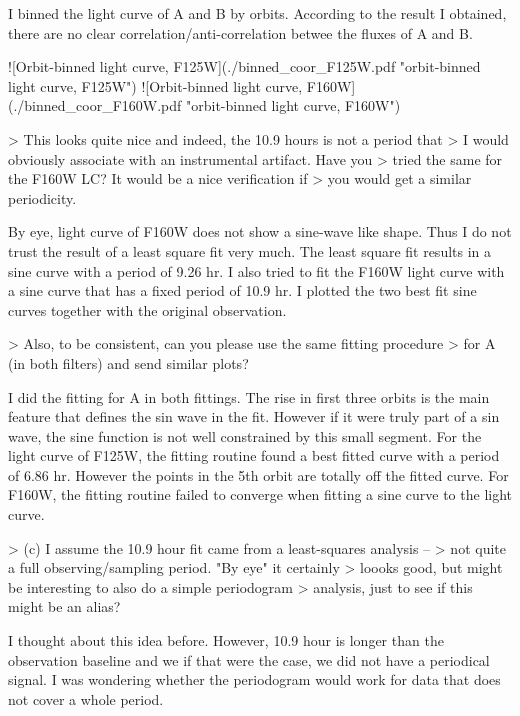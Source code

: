 \documentclass[paper=letter, fontsize=11pt]{scrartcl} %
\numberwithin{equation}{section} %
\numberwithin{figure}{section} %
\numberwithin{table}{section} %
\begin{document}
I binned the light curve of A and B by orbits. According to the result
I obtained, there are no clear correlation/anti-correlation betwee the
fluxes of A and B.

![Orbit-binned light curve, F125W](./binned_coor_F125W.pdf
"orbit-binned light curve, F125W")
![Orbit-binned light curve, F160W](./binned_coor_F160W.pdf
 "orbit-binned light curve, F160W")

> This looks quite nice and indeed, the 10.9 hours is not a period that
> I would obviously associate with an instrumental artifact.  Have you
> tried the same for the F160W LC? It would be a nice verification if
> you would get a similar periodicity.

By eye, light curve of F160W does not show a sine-wave like
shape. Thus I do not trust the result of a least square fit very
much. The least square fit results in a sine curve with a period of
9.26 hr. I also tried to fit the F160W light curve with a sine curve
that has a fixed period of 10.9 hr. I plotted the two best fit sine
curves together with the original observation.



> Also, to be consistent, can you please use the same fitting procedure
> for A (in both filters) and send similar plots?

I did the fitting for A in both fittings. The rise in first three
orbits is the main feature that defines the sin wave in the
fit. However if it were truly part of a sin wave, the sine function is
not well constrained by this small segment. For the light curve of
F125W, the fitting routine found a best fitted curve with a period of
6.86 hr. However the points in the 5th orbit are totally off the
fitted curve. For F160W, the fitting routine failed to converge when
fitting a sine curve to the light curve.


> (c) I assume the 10.9 hour fit came from a least-squares analysis --
> not quite a full observing/sampling period.  "By eye" it certainly
> loooks good, but might be interesting to also do a simple periodogram
> analysis, just to see if this might be an alias?

I thought about this idea before. However, 10.9 hour is longer than the
observation baseline and we if that were the case, we did not have a
periodical signal. I was wondering whether the periodogram would work
for data that does not cover a whole period.
\end{document}
